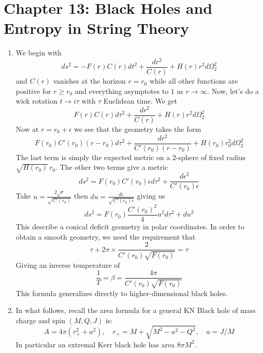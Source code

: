 \documentclass[11pt, class=article, crop=false]{standalone}
\begin{document}
\section*{Chapter 13: Black Holes and Entropy in String Theory} %
\label{sec:chapter_13_black_holes_and_entropy_in_string_theory}
\begin{enumerate}
	\item We begin with
	\[
		ds^2 = - F(r) C(r) dt^2 + \frac{dr^2}{C(r)} + H(r) r^2 d\Omega_2^2
	\]
	and $C(r)$ vanishes at the horizon $r = r_0$ while all other functions are positive for $r \geq r_0$ and everything asymptotes to $1$ as $r \to \infty$. Now, let's do a wick rotation $t \to i \tau$ with $\tau$ Euclidean time. We get
	\[
		F(r) C(r) d\tau^2 + \frac{dr^2}{C(r)} + H(r) r^2 d\Omega_2^2
	\]
	Now at $r = r_0 + \epsilon$ we see that the geometry takes the form
	\[
		F(r_0) C'(r_0) (r-r_0) d\tau^2 + \frac{dr^2}{C'(r_0) (r-r_0)} + H(r_0) r_0^2 d\Omega_2^2
	\]
	The last term is simply the expected metric on a 2-sphere of fixed radius $\sqrt{H(r_0)}\, r_0$. The other two terms give a metric
	\[
		ds^2 = F(r_0) C'(r_0) \epsilon d\tau^2 + \frac{d \epsilon^2}{C'(r_0) \epsilon}
	\]
	Take $u = \frac{2 \sqrt{\epsilon}}{\sqrt{C'(r_0)}}$ then $du = \frac{d\epsilon}{\sqrt{C'(r_0) \epsilon}}$ giving us
	\[
		ds^2 = F(r_0) \frac{C'(r_0)^2}{4} u^2 d\tau^2 + du^2
	\]
	This describe a conical deficit geometry in polar coordinates. In order to obtain a smooth geometry, we need the requirement that 
	\[
		\tau + 2 \pi \times \frac{2}{C'(r_0) \sqrt{F(r_0)}}  = \tau 
	\]
	Giving an inverse temperature of 
	\[
		\frac1T = \beta =  \frac{4 \pi}{C'(r_0) \sqrt{F(r_0)}}
	\]
	This formula generalizes directly to higher-dimensional black holes.
	
	\item 
	In what follows, recall the area formula for a general KN Black hole of mass charge and spin $(M, Q, J)$ is:
	\[
		A = 4 \pi (r_+^2 + a^2), \quad r_+ = M + \sqrt{M^2 - a^2 - Q^2}, \quad a = J/M
	\]
	In particular an extremal Kerr black hole has area $8 \pi M^2$. 
	

\end{enumerate}
\end{document}
